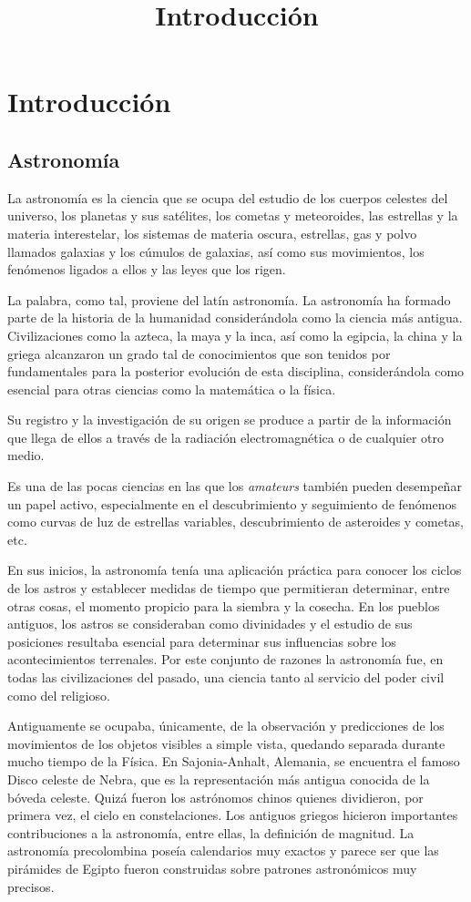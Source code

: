 \chapter{Introducción}
\title{Introducción}
\label{cap:Introduccion}

\section{Astronomía}
La astronomía es la ciencia que se ocupa del estudio de los cuerpos celestes del universo, los planetas y sus satélites, los cometas y meteoroides, las estrellas y la materia interestelar, los sistemas de materia oscura, estrellas, gas y polvo llamados galaxias y los cúmulos de galaxias, así como sus movimientos, los fenómenos ligados a ellos y las leyes que los rigen.

La palabra, como tal, proviene del latín astronomía. La astronomía ha formado parte de la historia de la humanidad considerándola como la ciencia más antigua. Civilizaciones como la azteca, la maya y la inca, así como la egipcia, la china y la griega alcanzaron un grado tal de conocimientos que son tenidos por fundamentales para la posterior evolución de esta disciplina, considerándola como esencial para otras ciencias como la matemática o la física.

Su registro y la investigación de su origen se produce a partir de la información que llega de ellos a través de la radiación electromagnética o de cualquier otro medio.

Es una de las pocas ciencias en las que los \textit{amateurs} también pueden desempeñar un papel activo, especialmente en el descubrimiento y seguimiento de fenómenos como curvas de luz de estrellas variables, descubrimiento de asteroides y cometas, etc.

En sus inicios, la astronomía tenía una aplicación práctica para conocer los ciclos de los astros y establecer medidas de tiempo que permitieran determinar, entre otras cosas, el momento propicio para la siembra y la cosecha. En los pueblos antiguos, los astros se consideraban como divinidades y el estudio de sus posiciones resultaba esencial para determinar sus influencias sobre los acontecimientos terrenales. Por este conjunto de razones la astronomía fue, en todas las civilizaciones del pasado, una ciencia tanto al servicio del poder civil como del religioso.

Antiguamente se ocupaba, únicamente, de la observación y predicciones de los movimientos de los objetos visibles a simple vista, quedando separada durante mucho tiempo de la Física. En Sajonia-Anhalt, Alemania, se encuentra el famoso Disco celeste de Nebra, que es la representación más antigua conocida de la bóveda celeste. Quizá fueron los astrónomos chinos quienes dividieron, por primera vez, el cielo en constelaciones. Los antiguos griegos hicieron importantes contribuciones a la astronomía, entre ellas, la definición de magnitud. La astronomía precolombina poseía calendarios muy exactos y parece ser que las pirámides de Egipto fueron construidas sobre patrones astronómicos muy precisos.

